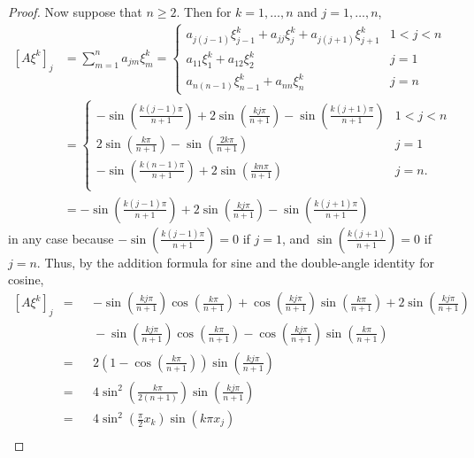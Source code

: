 \documentclass{homework}
\begin{document}
\begin{proof}
		Now suppose that $n \ge 2$. Then for $k=1,\dots,n$ and $j=1,\dots,n$,
		\begin{equation*}
		\begin{aligned}
			\left[A\xi^k\right]_j &= \sum_{m=1}^n a_{jm}\xi^k_m = \begin{cases}
				a_{j(j-1)}\xi^k_{j-1} + a_{jj}\xi^k_j + a_{j(j+1)}\xi^k_{j+1} & 1 < j < n \\
				a_{11}\xi^k_1 + a_{12}\xi^k_2 & j = 1 \\
				a_{n(n-1)}\xi^k_{n-1} + a_{nn}\xi^k_n & j = n
			\end{cases}\\
			&= \begin{cases}
				-\sin\left(\frac{k(j-1)\pi}{n+1}\right) + 2\sin\left(\frac{kj\pi}{n+1}\right) - \sin\left(\frac{k(j+1)\pi}{n+1}\right) & 1 < j < n \\
				2\sin\left(\frac{k\pi}{n+1}\right) - \sin\left(\frac{2k\pi}{n+1}\right) & j = 1 \\
				-\sin\left(\frac{k(n-1)\pi}{n+1}\right) + 2\sin\left(\frac{kn\pi}{n+1}\right) & j = n. \\
			\end{cases} \\
			&= -\sin\left(\frac{k(j-1)\pi}{n+1}\right) + 2\sin\left(\frac{kj\pi}{n+1}\right) - \sin\left(\frac{k(j+1)\pi}{n+1}\right)
		\end{aligned}
		\end{equation*}
		in any case because $-\sin\left(\frac{k(j-1)\pi}{n+1}\right) = 0$ if $j=1$, and $\sin\left(\frac{k(j+1)}{n+1}\right) = 0$ if $j = n$.
		Thus, by the addition formula for sine and the double-angle identity for cosine,
		\begin{equation*}
		\begin{alignedat}{2}
			\left[A\xi^k\right]_j &{}={}&&-\sin\left(\frac{kj\pi}{n+1}\right)\cos\left(\frac{k\pi}{n+1}\right) + \cos\left(\frac{kj\pi}{n+1}\right)\sin\left(\frac{k\pi}{n+1}\right) + 2\sin\left(\frac{kj\pi}{n+1}\right) \\
			&&& {}- \sin\left(\frac{kj\pi}{n+1}\right)\cos\left(\frac{k\pi}{n+1}\right) - \cos\left(\frac{kj\pi}{n+1}\right)\sin\left(\frac{k\pi}{n+1}\right) \\
			&={} && 2\left(1-\cos\left(\frac{k\pi}{n+1}\right)\right)\sin\left(\frac{kj\pi}{n+1}\right) \\
			&={} && 4\sin^2\left(\frac{k\pi}{2(n+1)}\right)\sin\left(\frac{kj\pi}{n+1}\right) \\
			&={} && 4\sin^2\left(\frac{\pi}{2}x_k\right)\sin\left(k\pi x_j\right) \\

\end{alignedat}
\end{equation*}
\end{proof}
\end{document}
